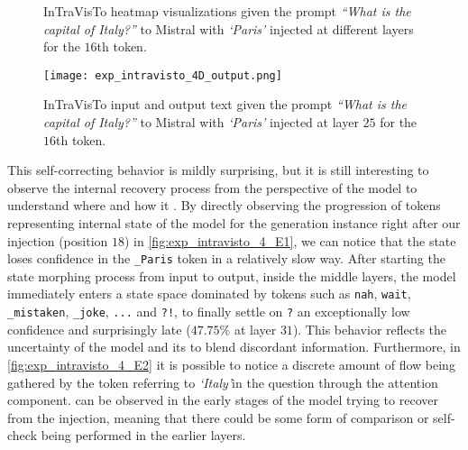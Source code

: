 \begin{figure}[t!]
    \centering
    \quad
    \caption{InTraVisTo heatmap visualizations given the prompt \emph{``What is the capital of Italy?''} to Mistral with \emph{`Paris'} injected at different layers for the $16$th token.}
    \label{fig:exp_intravisto_4_D}
\end{figure}

\begin{figure}[t!]
    \centering
    \texttt{[image: exp\_intravisto\_4D\_output.png]}
    \caption{InTraVisTo input and output text given the prompt \emph{``What is the capital of Italy?''} to Mistral with \emph{`Paris'} injected at layer $25$ for the $16$th token.}
    \label{fig:exp_intravisto_4_D3}
\end{figure}

This self-correcting behavior is mildly surprising, but it is still interesting to observe the internal recovery process from the perspective of the model to understand where and how it .
By directly observing the progression of tokens representing internal state of the model for the generation instance right after our injection (position $18$) in \cref{fig:exp_intravisto_4_E1}, we can notice that the state loses confidence in the \texttt{\_Paris} token in a relatively slow way.
After starting the state morphing process from input to output, inside the middle layers, the model immediately enters a state space dominated by tokens such as \texttt{nah}, \texttt{wait}, \texttt{\_mistaken}, \texttt{\_joke}, \texttt{...} and \texttt{?!}, to finally settle on \texttt{?}  an exceptionally low confidence and surprisingly late ($47.75\%$ at layer $31$).
This behavior reflects the uncertainty of the model and its  to blend discordant information.
Furthermore, in \cref{fig:exp_intravisto_4_E2} it is possible to notice a discrete amount of flow being gathered by the token referring to \emph{`Italy'}in the question through the attention component.
 can be observed in the early stages of the model trying to recover from the injection, meaning that there could be some form of comparison or self-check being performed in the earlier layers.

